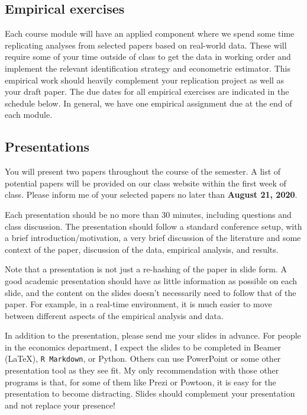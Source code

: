 \documentclass[11pt,]{article}
\begin{document}
\hypertarget{empirical-exercises}{%
\subsection{Empirical exercises}\label{empirical-exercises}}

Each course module will have an applied component where we spend some
time replicating analyses from selected papers based on real-world data.
These will require some of your time outside of class to get the data in
working order and implement the relevant identification strategy and
econometric estimator. This empirical work should heavily complement
your replication project as well as your draft paper. The due dates for
all empirical exercises are indicated in the schedule below. In general,
we have one empirical assignment due at the end of each module.

\hypertarget{presentations}{%
\subsection{Presentations}\label{presentations}}

You will present two papers throughout the course of the semester. A
list of potential papers will be provided on our class website within
the first week of class. Please inform me of your selected papers no
later than \textbf{August 21, 2020}.

Each presentation should be no more than 30 minutes, including questions
and class discussion. The presentation should follow a standard
conference setup, with a brief introduction/motivation, a very brief
discussion of the literature and some context of the paper, discussion
of the data, empirical analysis, and results.

Note that a presentation is not just a re-hashing of the paper in slide
form. A good academic presentation should have as little information as
possible on each slide, and the content on the slides doesn't
necessarily need to follow that of the paper. For example, in a
real-time environment, it is much easier to move between different
aspects of the empirical analysis and data.

In addition to the presentation, please send me your slides in advance.
For people in the economics department, I expect the slides to be
completed in Beamer (LaTeX), \texttt{R\ Markdown}, or Python. Others can
use PowerPoint or some other presentation tool as they see fit. My only
recommendation with those other programs is that, for some of them like
Prezi or Powtoon, it is easy for the presentation to become distracting.
Slides should complement your presentation and not replace your
presence!
\end{document}
